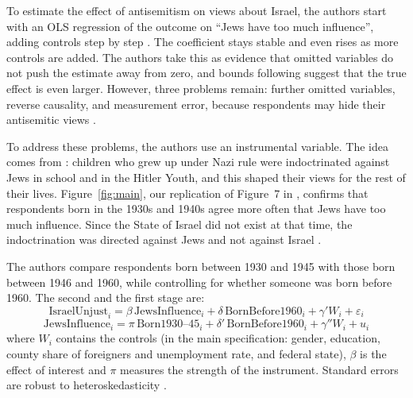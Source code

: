 
To estimate the effect of antisemitism on views about Israel, the authors start with an OLS regression of the outcome on ``Jews have too much influence'', adding controls step by step \citep[Table~7]{binstok2024}. The coefficient stays stable and even rises as more controls are added. The authors take this as evidence that omitted variables do not push the estimate away from zero, and bounds following \citet{oster2019} suggest that the true effect is even larger. However, three problems remain: further omitted variables, reverse causality, and measurement error, because respondents may hide their antisemitic views \citep[pp.~2352--2355]{binstok2024}.

To address these problems, the authors use an instrumental variable. The idea comes from \citet{voigtlaender2015}: children who grew up under Nazi rule were indoctrinated against Jews in school and in the Hitler Youth, and this shaped their views for the rest of their lives. Figure~\ref{fig:main}, our replication of Figure~7 in \citet{binstok2024}, confirms that respondents born in the 1930s and 1940s agree more often that Jews have too much influence. Since the State of Israel did not exist at that time, the indoctrination was directed against Jews and not against Israel \citep[pp.~2355--2356]{binstok2024}.

The authors compare respondents born between 1930 and 1945 with those born between 1946 and 1960, while controlling for whether someone was born before 1960. The second and the first stage are:
\begin{equation}\label{eq:main}
  \text{IsraelUnjust}_i = \beta\,\text{JewsInfluence}_i + \delta\,\text{BornBefore1960}_i + \gamma' W_i + \varepsilon_i
\end{equation}
\begin{equation}\label{eq:fs}
  \text{JewsInfluence}_i = \pi\,\text{Born1930--45}_i + \delta'\,\text{BornBefore1960}_i + \gamma'' W_i + u_i
\end{equation}
where $W_i$ contains the controls (in the main specification: gender, education, county share of foreigners and unemployment rate, and federal state), $\beta$ is the effect of interest and $\pi$ measures the strength of the instrument. Standard errors are robust to heteroskedasticity \citep[pp.~2358--2359]{binstok2024}.

